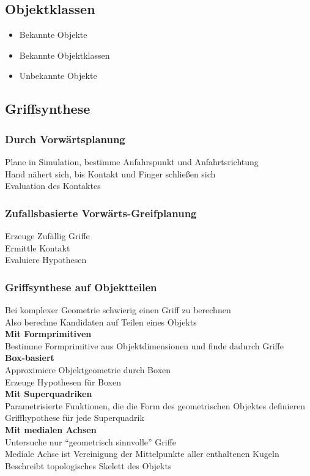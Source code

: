 \subsection{Objektklassen}
\begin{itemize}
\item Bekannte Objekte
\item Bekannte Objektklassen
\item Unbekannte Objekte
\end{itemize}

\subsection{Griffsynthese}
\subsubsection{Durch Vorwärtsplanung}
Plane in Simulation, bestimme Anfahrspunkt und Anfahrtsrichtung\\
Hand nähert sich, bis Kontakt und Finger schließen sich\\
Evaluation des Kontaktes

\subsubsection{Zufallsbasierte Vorwärts-Greifplanung}
Erzeuge Zufällig Griffe\\
Ermittle Kontakt\\
Evaluiere Hypothesen

\subsubsection{Griffsynthese auf Objektteilen}
Bei komplexer Geometrie schwierig einen Griff zu berechnen\\
Also berechne Kandidaten auf Teilen eines Objekts\\

\textbf{Mit Formprimitiven}\\
Bestimme Formprimitive aus Objektdimensionen und finde dadurch Griffe\\

\textbf{Box-basiert}\\
Approximiere Objektgeometrie durch Boxen\\
Erzeuge Hypothesen für Boxen\\

\textbf{Mit Superquadriken}\\
Parametrisierte Funktionen, die die Form des geometrischen Objektes definieren\\
Griffhypothese für jede Superquadrik\\

\textbf{Mit medialen Achsen}\\
Untersuche nur \enquote{geometrisch sinnvolle} Griffe\\
Mediale Achse ist Vereinigung der Mittelpunkte aller enthaltenen Kugeln\\
Beschreibt topologisches Skelett des Objekts\\


